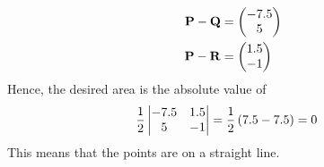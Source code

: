 
\begin{align}
  \mathbf{P}-\mathbf{Q} &= \begin{pmatrix}-7.5\\5\end{pmatrix}
  \\
  \mathbf{P}-\mathbf{R} &= \begin{pmatrix}1.5\\-1\end{pmatrix}
\end{align}
%
Hence, the desired area is the absolute value of 
\begin{align}
  \frac{1}{2} \begin{vmatrix}-7.5 & 1.5\\5 & -1 \end{vmatrix}
    &=\frac{1}{2}\left(7.5 -7.5\right) = 0
\end{align}
%
This means that the points are on a straight line.
